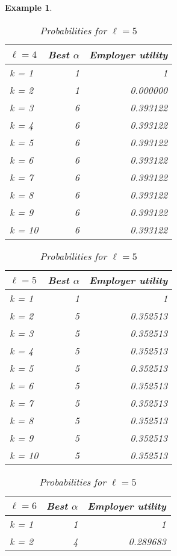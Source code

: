 \documentclass{article}
\newtheorem{example}{Example} %
\begin{document}
\begin{example}
\begin{table}[H]
\begin{minipage}{0.33\textwidth}
\small
\begin{tabular}{lrr}
\hline
$\ell=4$ & Best $\alpha$ & Employer utility \\
\hline
k = 1  &     1 &         1 \\
k = 2  &     1 &         0.000000 \\
k = 3  &     6 &         0.393122 \\
k = 4  &     6 &         0.393122 \\
k = 5  &     6 &         0.393122 \\
k = 6  &     6 &         0.393122 \\
k = 7  &     6 &         0.393122 \\
k = 8  &     6 &         0.393122 \\
k = 9  &     6 &         0.393122 \\
k = 10 &     6 &         0.393122 \\
\hline
\end{tabular}
\caption{Probabilities for $\ell=4$}
\end{minipage}\hfill
\centering
\begin{minipage}{0.33\textwidth}
\small
\begin{tabular}{lrr}
\hline
$\ell=5$ & Best $\alpha$ & Employer utility \\
\hline
k = 1  &     1 &         1 \\
k = 2  &     5 &         0.352513 \\
k = 3  &     5 &         0.352513 \\
k = 4  &     5 &         0.352513 \\
k = 5  &     5 &         0.352513 \\
k = 6  &     5 &         0.352513 \\
k = 7  &     5 &         0.352513 \\
k = 8  &     5 &         0.352513 \\
k = 9  &     5 &         0.352513 \\
k = 10 &     5 &         0.352513 \\
\hline
\end{tabular}
\caption{Probabilities for $\ell=5$}
\end{minipage}\hfill
\centering
\begin{minipage}{0.33\textwidth}
\small
\begin{tabular}{lrr}
\hline
$\ell=6$ & Best $\alpha$ & Employer utility \\
\hline
k = 1  &     1 &         1 \\
k = 2  &     4 &         0.289683 \\

\end{tabular}
\end{minipage}
\end{table}
\end{example}
\end{document}
